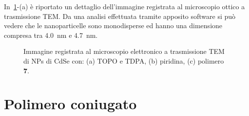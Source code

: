 {
In~\ref{fig:CdSe-TEM}-(a) è riportato un dettaglio dell'immagine registrata al microscopio ottico a trasmissione TEM\@. Da una analisi effettuata tramite apposito software si può vedere che le nanoparticelle sono monodisperse ed hanno una dimensione compresa tra 4.0~nm e 4.7~nm.

}
\begin{figure}[!htb]
\caption{\footnotesize{Immagine registrata al microscopio elettronico a trasmissione TEM di NPs di CdSe con: (a) TOPO e TDPA, (b) piridina, (c) polimero {\bf 7}. }}
\label{fig:CdSe-TEM}
\end{figure}
\section{Polimero coniugato}

